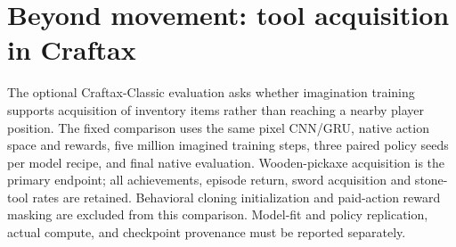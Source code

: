 \section{Beyond movement: tool acquisition in Craftax}
\label{sec:craftax-inventory}

The optional Craftax-Classic evaluation asks whether imagination training supports acquisition of
inventory items rather than reaching a nearby player position. The fixed comparison uses the same
pixel CNN/GRU, native action space and rewards, five million imagined training steps, three paired
policy seeds per model recipe, and final native evaluation. Wooden-pickaxe acquisition is the
primary endpoint; all achievements, episode return, sword acquisition and stone-tool rates are
retained. Behavioral cloning initialization and paid-action reward masking are excluded from this
comparison. Model-fit and policy replication, actual compute, and checkpoint provenance must be
reported separately.

